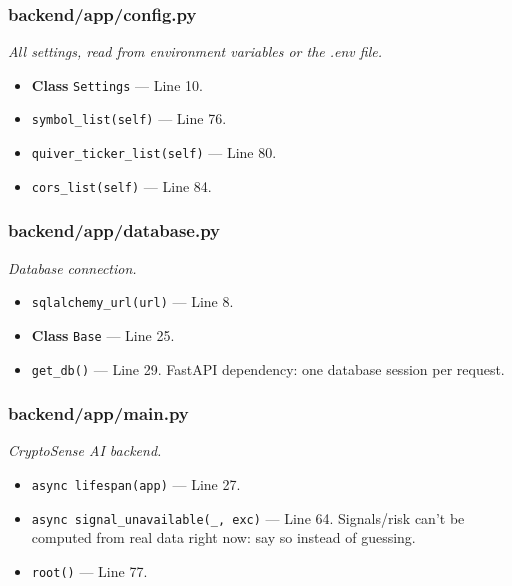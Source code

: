 \subsubsection*{backend/app/config.py}
\textit{All settings, read from environment variables or the .env file.}
\begin{itemize}[nosep,leftmargin=1.5em]
\item \textbf{Class} \texttt{Settings} --- Line 10.
\item \hspace*{1em}\texttt{symbol\_\allowbreak{}list(\allowbreak{}self)} --- Line 76.
\item \hspace*{1em}\texttt{quiver\_\allowbreak{}ticker\_\allowbreak{}list(\allowbreak{}self)} --- Line 80.
\item \hspace*{1em}\texttt{cors\_\allowbreak{}list(\allowbreak{}self)} --- Line 84.
\end{itemize}
\subsubsection*{backend/app/database.py}
\textit{Database connection.}
\begin{itemize}[nosep,leftmargin=1.5em]
\item \texttt{sqlalchemy\_\allowbreak{}url(\allowbreak{}url)} --- Line 8.
\item \textbf{Class} \texttt{Base} --- Line 25.
\item \texttt{get\_\allowbreak{}db(\allowbreak{})} --- Line 29. FastAPI dependency: one database session per request.
\end{itemize}
\subsubsection*{backend/app/main.py}
\textit{CryptoSense AI backend.}
\begin{itemize}[nosep,leftmargin=1.5em]
\item \texttt{async lifespan(\allowbreak{}app)} --- Line 27.
\item \texttt{async signal\_\allowbreak{}unavailable(\allowbreak{}\_\allowbreak{},\allowbreak{} exc)} --- Line 64. Signals/risk can't be computed from real data right now: say so instead of guessing.
\item \texttt{root(\allowbreak{})} --- Line 77.
\end{itemize}

